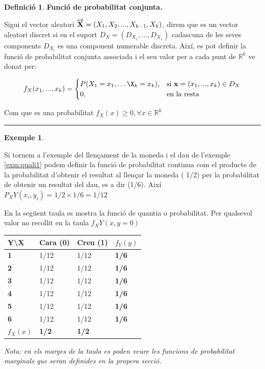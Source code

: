 \documentclass[
  catalan,
]{article}
\newcounter{none} %
\theoremstyle{definition}
\newtheorem{definition}{Definició}[section]
\theoremstyle{definition}
\newtheorem{example}{Exemple}[section]
\theoremstyle{definition}
\theoremstyle{definition}
\theoremstyle{remark}
\begin{document}
\begin{definition}
\textbf{Funció de probabilitat conjunta.}

Sigui el vector aleatori \(\overrightarrow{\bf{X}}=(X_1,X_2,...,X_{k-1},X_k)\), direm que es un vector aleatori discret si en el suport \(D_X=(D_{X_1},...,D_{X_1})\) cadascuna de les seves components \(D_{X_i}\) es una component numerable discreta. Així, es pot definir la funció de probabilitat conjunta associada i el seu valor per a cada punt de \(\mathbb{R}^k\) ve donat per:

\[
f_X(x_1,...,x_k)=
\begin{cases}
P(X_1=x_1,\ldots\X_k=x_k ), & \text{si } \mathbf{x}=(x_1,...,x_k) \in D_X \\
0, & \text{en la resta}
\end{cases}
\]
\end{definition}

Com que es una probabilitat \(f_X(x) \geq 0, \forall x \in \mathbb{R}^k\)

\begin{center}\rule{0.5\linewidth}{0.5pt}\end{center}

\begin{example}
\protect\hypertarget{exm:taula-discreta}{}\label{exm:taula-discreta}

Si tornem a l'exemple del llençament de la moneda i el dau de l'exemple \ref{exm:quali1} podem definir la funció de probabilitat continua com el producte de la probabilitat d'obtenir el resultat al llençar la moneda ( 1/2) per la probabilitat de obtenir un resultat del dau, es a dir (1/6). Així \(P_XY(x_i,y_i)=1/2 \times 1/6= 1/12\)

En la següent taula es mostra la funció de quantia o probabilitat. Per qualsevol valor no recollit en la taula \(f_XY(x,y=0)\)

{\def\LTcaptype{none} %
\begin{longtable}[]{@{}llll@{}}
\toprule\noalign{}
\textbf{Y\textbackslash X} & Cara (0) & Creu (1) & \textbf{\(f_Y(y)\)} \\
\midrule\noalign{}
\endhead
\bottomrule\noalign{}
\endlastfoot
\textbf{1} & 1/12 & 1/12 & \textbf{1/6} \\
\textbf{2} & 1/12 & 1/12 & \textbf{1/6} \\
\textbf{3} & 1/12 & 1/12 & \textbf{1/6} \\
\textbf{4} & 1/12 & 1/12 & \textbf{1/6} \\
\textbf{5} & 1/12 & 1/12 & \textbf{1/6} \\
\textbf{6} & 1/12 & 1/12 & \textbf{1/6} \\
\textbf{\(f_X(x)\)} & \textbf{1/2} & \textbf{1/2} & \\
\end{longtable}
}

\emph{Nota: en els marges de la taula es poden veure les funcions de probabilitat marginals que seran definides en la propera secció.}

\end{example}
\end{document}
